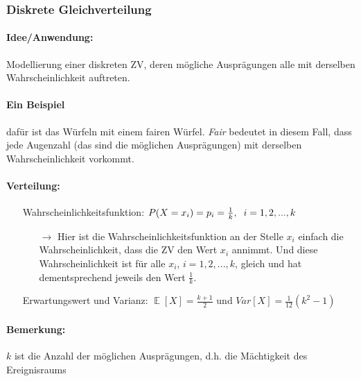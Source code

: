 \documentclass[a4paper]{article}
\DeclareMathOperator*{\E}{\mathbb{E}}
\begin{document}
\subsubsection{Diskrete Gleichverteilung} \label{sec:duni}

\paragraph{Idee/Anwendung:} Modellierung einer diskreten ZV, deren mögliche Ausprägungen alle mit derselben Wahrscheinlichkeit auftreten. 

\paragraph{Ein Beispiel} dafür ist das Würfeln mit einem fairen Würfel. \textit{Fair} bedeutet in diesem Fall, dass jede Augenzahl (das sind die möglichen Ausprägungen) mit derselben Wahrscheinlichkeit vorkommt.

\paragraph{Verteilung:} 
\begin{itemize}
\item[] Wahrscheinlichkeitsfunktion: $P(X=x_i)=p_i=\frac{1}{k}, \hspace{0.2cm} i=1,2,...,k$
	\begin{itemize}
	\item[$\rightarrow$] Hier ist die Wahrscheinlichkeitsfunktion an der Stelle $x_i$ einfach die Wahrscheinlichkeit, dass die ZV den Wert $x_i$ annimmt. Und diese Wahrscheinlichkeit ist für alle $x_i$, $i=1,2,...,k$, gleich und hat dementsprechend jeweils den Wert $\frac{1}{k}$.
	\end{itemize}
\item[] Erwartungswert und Varianz: $\E[X]=\frac{k+1}{2}$ und $Var[X]=\frac{1}{12}(k^2-1)$
\end{itemize}
\paragraph{Bemerkung:} $k$ ist die Anzahl der möglichen Ausprägungen, d.h. die Mächtigkeit des Ereignisraums\\

\noindent {}
\end{document}

